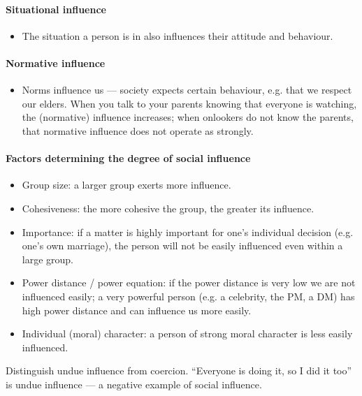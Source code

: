 \paragraph{Situational influence}
\begin{itemize}
\item The situation a person is in also influences their attitude and behaviour.
\end{itemize}

\paragraph{Normative influence}
\begin{itemize}
\item Norms influence us --- society expects certain behaviour, e.g. that we respect our elders. When you talk to your parents knowing that everyone is watching, the (normative) influence increases; when onlookers do not know the parents, that normative influence does not operate as strongly.
\end{itemize}

\paragraph{Factors determining the degree of social influence}
\begin{itemize}
\item Group size: a larger group exerts more influence.
\item Cohesiveness: the more cohesive the group, the greater its influence.
\item Importance: if a matter is highly important for one's individual decision (e.g. one's own marriage), the person will not be easily influenced even within a large group.
\item Power distance / power equation: if the power distance is very low we are not influenced easily; a very powerful person (e.g. a celebrity, the PM, a DM) has high power distance and can influence us more easily.
\item Individual (moral) character: a person of strong moral character is less easily influenced.
\end{itemize}

\begin{CriticalPoint}
Distinguish undue influence from coercion. ``Everyone is doing it, so I did it too'' is undue influence --- a negative example of social influence.
\end{CriticalPoint}

